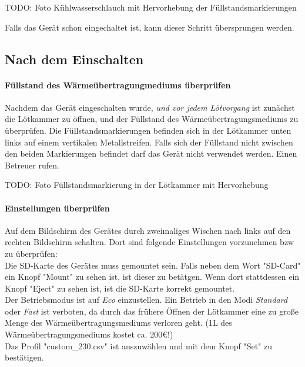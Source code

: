\documentclass{\basedir/fablab-document}
\begin{document}
TODO: Foto Kühlwasserschlauch mit Hervorhebung der Füllstandsmarkierungen

Falls das Gerät schon eingechaltet ist, kann dieser Schritt übersprungen werden.

\subsection{Nach dem Einschalten}

\paragraph{Füllstand des Wärmeübertragungmediums überprüfen}

Nachdem das Gerät eingeschalten wurde, \textit{und vor jedem Lötvorgang} ist zunächst die Lötkammer zu öffnen, und der Füllstand des Wärmeübertragungsmediums zu überprüfen. Die Füllstandsmarkierungen befinden sich in der Lötkammer unten links auf einem vertikalen Metallstreifen. Falls sich der Füllstand nicht zwischen den beiden Markierungen befindet darf das Gerät nicht verwendet werden. Einen Betreuer rufen.

TODO: Foto Füllstandsmarkierung in der Lötkammer mit Hervorhebung

\paragraph{Einstellungen überprüfen}

Auf dem Bildschirm des Gerätes durch zweimaliges Wischen nach links auf den rechten Bildschirm schalten. Dort sind folgende Einstellungen vorzunehmen bzw zu überprüfen:\\

Die SD-Karte des Gerätes muss gemountet sein. Falls neben dem Wort "SD-Card" ein Knopf "Mount" zu sehen ist, ist dieser zu betätgen. Wenn dort stattdessen ein Knopf "Eject" zu sehen ist, ist die SD-Karte korrekt gemountet.\\

Der Betriebsmodus ist auf \textit{Eco} einzustellen. Ein Betrieb in den Modi \textit{Standard} oder \textit{Fast} ist verboten, da durch das frühere Öffnen der Lötkammer eine zu große Menge des Wärmeübertragungsmediums verloren geht. (1L des Wärmeübertragungsmediums kostet ca. 200€!)\\

Das Profil "custom_230.csv" ist auszuwählen und mit dem Knopf "Set" zu bestätigen.\\
\end{document}
